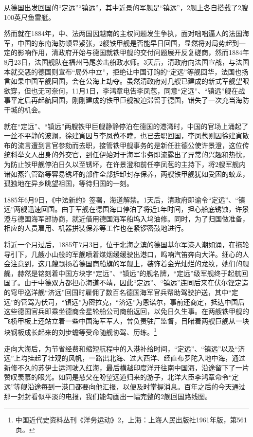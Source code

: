 \documentclass[12pt,UTF8]{ctexbook}
\begin{document}
从德国出发回国的“定远”“镇远”，其中近景的军舰是“镇远”，2舰上各自搭载了2艘100英尺鱼雷艇。

然而就在1884年，中、法两国因越南的主权问题发生争执，面对咄咄逼人的法国海军，中国的东南海防顿显紧张，2艘铁甲舰是否能早日回国，显然将对局势起到一定的影响作用，清政府开始与德国就铁甲舰的交付问题展开反复磋商，然而1884年8月23日，法国舰队在福州马尾袭击船政水师。3天后，清政府向法国宣战，与法国本就交恶的德国则宣布“局外中立”，拒绝让中国订购的“定远”等舰回华，法国也扬言如果中国军舰回国，会在公海上劫夺。虽然清政府对几艘已建成的新式军舰望眼欲穿，但也无可奈何，11月1日，李鸿章电告李凤苞，同意“定远”、“镇远”舰在战事平定后再起航回国，刚刚建成的铁甲巨舰被迫滞留于德国，错失了一次充当海防干城的机会。

就在“定远”、“镇远”两艘铁甲巨舰静静停泊在德国的港湾时，中国的官场上涌起了一丝不平静的波澜，徐建寅因与李凤苞不睦，也已去职回国，李凤苞则因徐建寅散布的流言遭到言官参劾而去职，接管铁甲舰事务的是新任驻德公使许景澄，这位传统科举文人出身的外交官，到任伊始对于海军事务即流露出了异常的兴趣和热忱，为防止铁甲舰停泊日久以至锈坏，在许景澄和前任李凤苞的主持下，将2艘军舰内诸如蒸汽管路等容易锈坏的部件全部拆卸封存保养，两艘铁甲舰犹如受困的蛟龙，孤独地在异乡眺望祖国，等待归国的一刻。

1885年6月9日，《中法新约》签署，海道解禁。1天后，清政府即谕令“定远”、“镇远”两舰迅速回国。由于军舰在德国海口停泊了将近1年时间，担心船底锈蚀，许景澄与德国海军部协商，就近借用德国海军船坞入坞油修。同时，为了归国做准备，相应的人员雇用、机器拼装保养等工作也在紧锣密鼓地进行。

将近一个月过后，1885年7月3日，位于北海之滨的德国基尔军港人潮如涌，在拖轮导引下，几艘小山般的军舰喷着煤烟缓缓驶出港口，鸣响汽笛奔向大洋。细心的人会注意到，这几艘飘扬着德国商船旗的军舰上，装饰着金光灿烂的龙纹，她们的舰艉，赫然是铭刻着中国方块字“定远”、“镇远”的舰名牌，“定远”级军舰终于起航回国了。由于中德双方都担心海道不靖，因此“定远”、“镇远”连同后来在伏尔铿定造的穹甲巡洋舰“济远”回国时雇佣了数百名德国海军官兵帮助驾驶护送，其中“定远”的管驾为伏司，“镇远”为密拉克，“济远”为恩诺尔，事前还商定，抵达中国后这些德国官兵即乘坐德商金星轮船公司商船返回，以免日久生事。在两艘铁甲舰的飞桥甲板上还站立着一些中国海军军人，曾负责驻厂监督，目睹着两艘巨舰从一块块钢板成长起来的刘步蟾等受命随舰协驾、历练。\footnote{中国近代史资料丛刊《洋务运动》2，上海：上海人民出版社1961年版，第561页。}

走向大海后，为节省经费和缩短航程中的入港补给时间，“定远”、“镇远”以及“济远”上均挂起了壮观的风帆，一路出北海、过大西洋、经直布罗陀入地中海，通过新修不久的苏伊士运河驶入红海，最后横越印度洋开往南中国海，沿途留下了一片赞叹羡慕的眼光。如同是慈父在盼望远道归来的游子，北洋大臣李鸿章命令“定远”等舰沿途每到一港口都要向他汇报，以便及时掌握消息。百年之后的今天通过那一封封看似平淡的电报，我们能勾画出一幅完整的2舰回国路线图。
\end{document}
